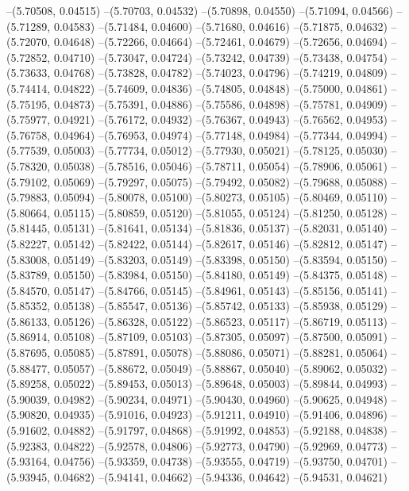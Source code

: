 --(5.70508, 0.04515)
--(5.70703, 0.04532)
--(5.70898, 0.04550)
--(5.71094, 0.04566)
--(5.71289, 0.04583)
--(5.71484, 0.04600)
--(5.71680, 0.04616)
--(5.71875, 0.04632)
--(5.72070, 0.04648)
--(5.72266, 0.04664)
--(5.72461, 0.04679)
--(5.72656, 0.04694)
--(5.72852, 0.04710)
--(5.73047, 0.04724)
--(5.73242, 0.04739)
--(5.73438, 0.04754)
--(5.73633, 0.04768)
--(5.73828, 0.04782)
--(5.74023, 0.04796)
--(5.74219, 0.04809)
--(5.74414, 0.04822)
--(5.74609, 0.04836)
--(5.74805, 0.04848)
--(5.75000, 0.04861)
--(5.75195, 0.04873)
--(5.75391, 0.04886)
--(5.75586, 0.04898)
--(5.75781, 0.04909)
--(5.75977, 0.04921)
--(5.76172, 0.04932)
--(5.76367, 0.04943)
--(5.76562, 0.04953)
--(5.76758, 0.04964)
--(5.76953, 0.04974)
--(5.77148, 0.04984)
--(5.77344, 0.04994)
--(5.77539, 0.05003)
--(5.77734, 0.05012)
--(5.77930, 0.05021)
--(5.78125, 0.05030)
--(5.78320, 0.05038)
--(5.78516, 0.05046)
--(5.78711, 0.05054)
--(5.78906, 0.05061)
--(5.79102, 0.05069)
--(5.79297, 0.05075)
--(5.79492, 0.05082)
--(5.79688, 0.05088)
--(5.79883, 0.05094)
--(5.80078, 0.05100)
--(5.80273, 0.05105)
--(5.80469, 0.05110)
--(5.80664, 0.05115)
--(5.80859, 0.05120)
--(5.81055, 0.05124)
--(5.81250, 0.05128)
--(5.81445, 0.05131)
--(5.81641, 0.05134)
--(5.81836, 0.05137)
--(5.82031, 0.05140)
--(5.82227, 0.05142)
--(5.82422, 0.05144)
--(5.82617, 0.05146)
--(5.82812, 0.05147)
--(5.83008, 0.05149)
--(5.83203, 0.05149)
--(5.83398, 0.05150)
--(5.83594, 0.05150)
--(5.83789, 0.05150)
--(5.83984, 0.05150)
--(5.84180, 0.05149)
--(5.84375, 0.05148)
--(5.84570, 0.05147)
--(5.84766, 0.05145)
--(5.84961, 0.05143)
--(5.85156, 0.05141)
--(5.85352, 0.05138)
--(5.85547, 0.05136)
--(5.85742, 0.05133)
--(5.85938, 0.05129)
--(5.86133, 0.05126)
--(5.86328, 0.05122)
--(5.86523, 0.05117)
--(5.86719, 0.05113)
--(5.86914, 0.05108)
--(5.87109, 0.05103)
--(5.87305, 0.05097)
--(5.87500, 0.05091)
--(5.87695, 0.05085)
--(5.87891, 0.05078)
--(5.88086, 0.05071)
--(5.88281, 0.05064)
--(5.88477, 0.05057)
--(5.88672, 0.05049)
--(5.88867, 0.05040)
--(5.89062, 0.05032)
--(5.89258, 0.05022)
--(5.89453, 0.05013)
--(5.89648, 0.05003)
--(5.89844, 0.04993)
--(5.90039, 0.04982)
--(5.90234, 0.04971)
--(5.90430, 0.04960)
--(5.90625, 0.04948)
--(5.90820, 0.04935)
--(5.91016, 0.04923)
--(5.91211, 0.04910)
--(5.91406, 0.04896)
--(5.91602, 0.04882)
--(5.91797, 0.04868)
--(5.91992, 0.04853)
--(5.92188, 0.04838)
--(5.92383, 0.04822)
--(5.92578, 0.04806)
--(5.92773, 0.04790)
--(5.92969, 0.04773)
--(5.93164, 0.04756)
--(5.93359, 0.04738)
--(5.93555, 0.04719)
--(5.93750, 0.04701)
--(5.93945, 0.04682)
--(5.94141, 0.04662)
--(5.94336, 0.04642)
--(5.94531, 0.04621)
